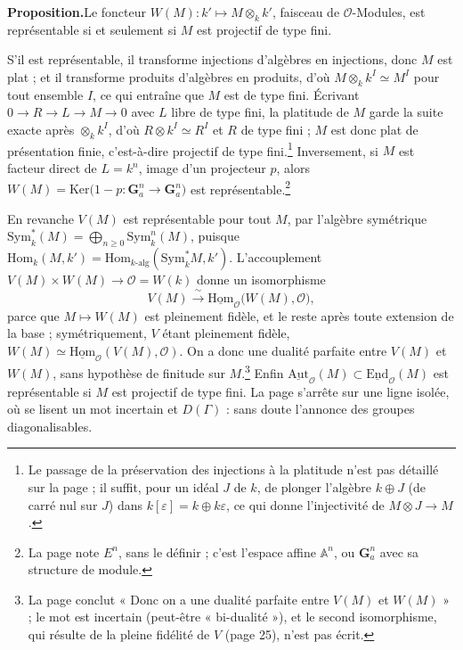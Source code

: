 \documentclass[11pt,a4paper]{article}
\begin{document}
\textbf{Proposition.}\quad Le foncteur $W(M) \colon k' \mapsto M \otimes_{k} k'$, faisceau de
$\mathcal{O}$-Modules, est représentable si et seulement si $M$ est
projectif de type fini.

S'il est représentable, il transforme injections d'algèbres en injections,
donc $M$ est plat ; et il transforme produits d'algèbres en produits, d'où
$M \otimes_{k} k^{I} \simeq M^{I}$ pour tout ensemble $I$, ce qui entraîne
que $M$ est de type fini. Écrivant $0 \to R \to L \to M \to 0$ avec $L$ libre
de type fini, la platitude de $M$ garde la suite exacte après
$\otimes_{k} k^{I}$, d'où $R \otimes k^{I} \simeq R^{I}$ et $R$ de type fini ;
$M$ est donc plat de présentation finie, c'est-à-dire projectif de type
fini.\footnote{Le passage de la préservation des injections à la platitude
n'est pas détaillé sur la page ; il suffit, pour un idéal $J$ de $k$, de
plonger l'algèbre $k \oplus J$ (de carré nul sur $J$) dans
$k[\varepsilon] = k \oplus k \varepsilon$, ce qui donne l'injectivité de
$M \otimes J \to M$.}
Inversement, si $M$ est facteur direct de $L = k^{n}$, image d'un
projecteur $p$, alors $W(M) = \mathrm{Ker}\bigl(1 - p \colon \mathbf{G}_{a}^{n}
\to \mathbf{G}_{a}^{n}\bigr)$ est représentable.\footnote{La page note
$E^{n}$, sans le définir ; c'est l'espace affine $\mathbb{A}^{n}$, ou
$\mathbf{G}_{a}^{n}$ avec sa structure de module.}

En revanche $V(M)$ est représentable pour tout $M$, par l'algèbre symétrique
$\mathrm{Sym}^{*}_{k}(M) = \bigoplus_{n \geqslant 0} \mathrm{Sym}^{n}_{k}(M)$,
puisque $\mathrm{Hom}_{k}(M, k') = \mathrm{Hom}_{k\text{-alg}}(\mathrm{Sym}^{*}_{k} M, k')$.
L'accouplement $V(M) \times W(M) \to \mathcal{O} = W(k)$ donne un isomorphisme
\[
  V(M) \xrightarrow{\ \sim\ } \underline{\mathrm{Hom}}_{\mathcal{O}}\bigl(W(M), \mathcal{O}\bigr),
\]
parce que $M \mapsto W(M)$ est pleinement fidèle, et le reste après toute
extension de la base ; symétriquement, $V$ étant pleinement fidèle,
$W(M) \simeq \underline{\mathrm{Hom}}_{\mathcal{O}}(V(M), \mathcal{O})$. On a
donc une dualité parfaite entre $V(M)$ et $W(M)$, sans hypothèse de finitude
sur $M$.\footnote{La page conclut « Donc on a une dualité
parfaite entre $V(M)$ et $W(M)$ » ; le mot est incertain (peut-être
« bi-dualité »), et le second isomorphisme, qui résulte de la pleine fidélité
de $V$ (page 25), n'est pas écrit.}
Enfin $\underline{\mathrm{Aut}}_{\mathcal{O}}(M) \subset
\underline{\mathrm{End}}_{\mathcal{O}}(M)$ est représentable si $M$ est
projectif de type fini. La page s'arrête sur une ligne isolée, où se lisent
un mot incertain et $D(\Gamma)$ : sans doute l'annonce des groupes
diagonalisables.
\end{document}
